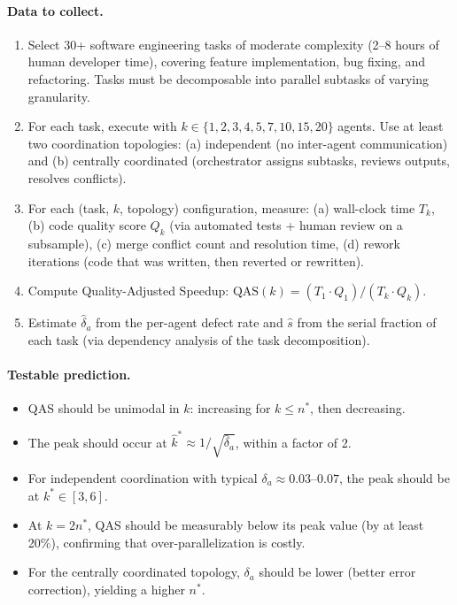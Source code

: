 \paragraph{Data to collect.}
\begin{enumerate}[nosep]
    \item Select 30+ software engineering tasks of moderate complexity (2--8 hours of human developer time), covering feature implementation, bug fixing, and refactoring. Tasks must be decomposable into parallel subtasks of varying granularity.
    \item For each task, execute with $k \in \{1, 2, 3, 4, 5, 7, 10, 15, 20\}$ agents. Use at least two coordination topologies: (a) independent (no inter-agent communication) and (b) centrally coordinated (orchestrator assigns subtasks, reviews outputs, resolves conflicts).
    \item For each (task, $k$, topology) configuration, measure: (a) wall-clock time $T_k$, (b) code quality score $Q_k$ (via automated tests + human review on a subsample), (c) merge conflict count and resolution time, (d) rework iterations (code that was written, then reverted or rewritten).
    \item Compute Quality-Adjusted Speedup: $\text{QAS}(k) = (T_1 \cdot Q_1) / (T_k \cdot Q_k)$.
    \item Estimate $\hat{\delta}_a$ from the per-agent defect rate and $\hat{s}$ from the serial fraction of each task (via dependency analysis of the task decomposition).
\end{enumerate}

\paragraph{Testable prediction.}
\begin{itemize}[nosep]
    \item QAS should be unimodal in $k$: increasing for $k \leq n^*$, then decreasing.
    \item The peak should occur at $\hat{k}^* \approx 1/\sqrt{\hat{\delta}_a}$, within a factor of 2.
    \item For independent coordination with typical $\delta_a \approx 0.03$--$0.07$, the peak should be at $k^* \in [3, 6]$.
    \item At $k = 2n^*$, QAS should be measurably below its peak value (by at least 20\%), confirming that over-parallelization is costly.
    \item For the centrally coordinated topology, $\delta_a$ should be lower (better error correction), yielding a higher $n^*$.
\end{itemize}

